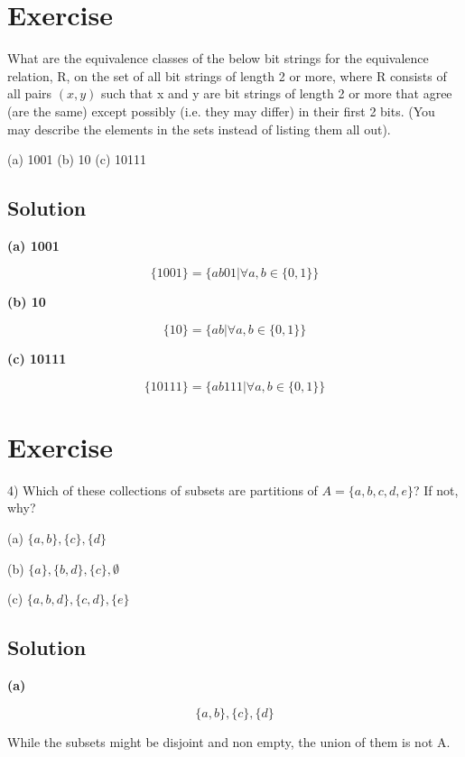 \documentclass[paper=a4, fontsize=11pt]{scrartcl} %
\numberwithin{equation}{section} %
\numberwithin{figure}{section} %
\numberwithin{table}{section} %
\begin{document}
\section{Exercise}

What are the equivalence classes of the below bit strings for the equivalence
relation, R, on the set of all bit strings of length 2 or more, where R consists of all
pairs $(x, y)$ such that x and y are bit strings of length 2 or more that agree (are the
same) except possibly (i.e. they may differ) in their first 2 bits. (You may describe the
elements in the sets instead of listing them all out).

(a) 1001 (b) 10 (c) 10111 

\subsection{Solution}

\textbf{(a) 1001} 

$$ \{1001\} = \{ab01 \vert \forall a,b \in \{0,1\}\}$$

\textbf{(b) 10} 

$$ \{10\} = \{ab \vert \forall a,b \in \{0,1\}\}$$

\textbf{(c) 10111} 

$$ \{10111\} = \{ab111 \vert \forall a,b \in \{0,1\}\}$$


\section{Exercise}

4) Which of these collections of subsets are partitions of $A = \{a,b,c,d,e\}$? If not, why?

(a) $\{a,b\},\{c\},\{d\}$

(b) $\{a\},\{b,d\},\{c\},\emptyset$

(c) $\{a,b,d\},\{c,d\},\{e\}$

\subsection{Solution}

\textbf{(a)}

$$\{a,b\},\{c\},\{d\}$$

While the subsets might be disjoint and non empty, the union of them is not A.
\end{document}
